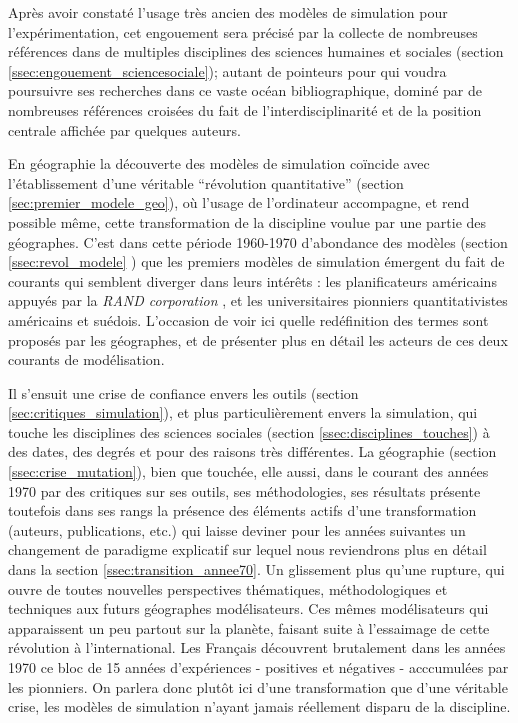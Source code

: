 Après avoir constaté l'usage très ancien des modèles de simulation pour l'expérimentation, cet engouement sera précisé par la collecte de nombreuses références dans de multiples disciplines des sciences humaines et sociales (section \ref{ssec:engouement_sciencesociale}); autant de pointeurs pour qui voudra poursuivre ses recherches dans ce vaste océan bibliographique, dominé par de nombreuses références croisées du fait de l'interdisciplinarité et de la position centrale affichée par quelques auteurs.

En géographie la découverte des modèles de simulation coïncide avec l'établissement d'une véritable \enquote{révolution quantitative} (section \ref{sec:premier_modele_geo}), où l'usage de l'ordinateur accompagne, et rend possible même, cette transformation de la discipline voulue par une partie des géographes. C'est dans cette période 1960-1970 d'abondance des modèles (section \ref{ssec:revol_modele} ) que les premiers modèles de simulation émergent du fait de courants qui semblent diverger dans leurs intérêts : les planificateurs américains appuyés par la \textit{RAND corporation} , et les universitaires pionniers quantitativistes américains et suédois. L'occasion de voir ici quelle redéfinition des termes sont proposés par les géographes, et de présenter plus en détail les acteurs de ces deux courants de modélisation.

Il s'ensuit une crise de confiance envers les outils  (section \ref{sec:critiques_simulation}), et plus particulièrement envers la simulation, qui touche les disciplines des sciences sociales (section \ref{ssec:disciplines_touches}) à des dates, des degrés et pour des raisons très différentes. La géographie (section \ref{ssec:crise_mutation}), bien que touchée, elle aussi, dans le courant des années 1970 par des critiques sur ses outils, ses méthodologies, ses résultats présente toutefois dans ses rangs la présence des éléments actifs d'une transformation (auteurs, publications, etc.) qui laisse deviner pour les années suivantes un changement de paradigme explicatif sur lequel nous reviendrons plus en détail dans la section \ref{ssec:transition_annee70}. Un glissement plus qu'une rupture, qui ouvre de toutes nouvelles perspectives thématiques, méthodologiques et techniques aux futurs géographes modélisateurs. Ces mêmes modélisateurs qui apparaissent un peu partout sur la planète, faisant suite à l'essaimage de cette révolution à l'international. Les Français découvrent brutalement dans les années 1970 ce bloc de 15 années d'expériences - positives et négatives - acccumulées par les pionniers. On parlera donc plutôt ici d'une transformation que d'une véritable crise, les modèles de simulation n'ayant jamais réellement disparu de la discipline. 

